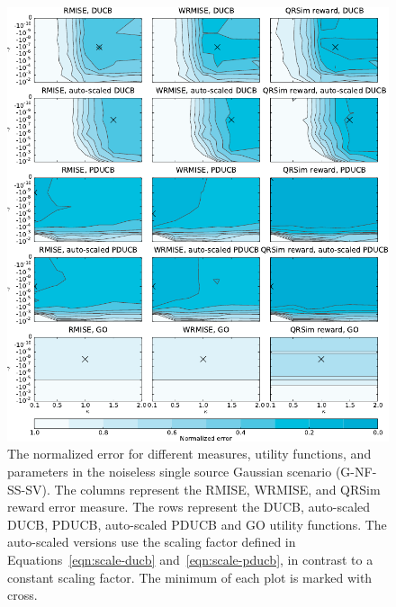 \begin{figure}
    \centering
    \includegraphics{plots/psearch-G-NF-SS-SV}
    \caption[Normalized error (G-NF-SS-SV)]{The normalized error for different 
        measures, utility functions, and parameters in the noiseless single 
        source Gaussian scenario (G-NF-SS-SV).  The columns represent the RMISE, 
        WRMISE, and QRSim reward error measure.  The rows represent the DUCB, 
        auto-scaled DUCB, PDUCB, auto-scaled PDUCB and GO utility functions. The 
        auto-scaled versions use the scaling factor defined in 
        Equations~\ref{eqn:scale-ducb} and~\ref{eqn:scale-pducb}, in contrast to 
        a constant scaling factor. The minimum of each plot is marked with 
        cross.}\label{fig:psearch-G-NF-SS-SV}
\end{figure}

